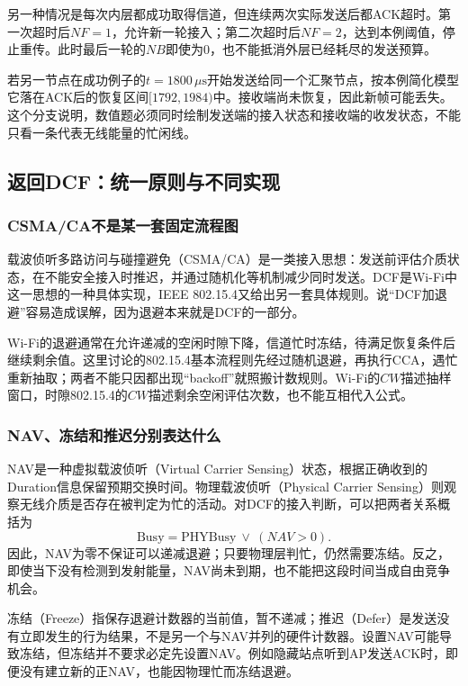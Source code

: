 另一种情况是每次内层都成功取得信道，但连续两次实际发送后都ACK超时。第一次超时后$NF=1$，允许新一轮接入；第二次超时后$NF=2$，达到本例阈值，停止重传。此时最后一轮的$NB$即使为0，也不能抵消外层已经耗尽的发送预算。

若另一节点在成功例子的$t=1800\,\mu\mathrm{s}$开始发送给同一个汇聚节点，按本例简化模型它落在ACK后的恢复区间$[1792,1984)$中。接收端尚未恢复，因此新帧可能丢失。这个分支说明，数值题必须同时绘制发送端的接入状态和接收端的收发状态，不能只看一条代表无线能量的忙闲线。

\subsection{返回DCF：统一原则与不同实现}

\subsubsection{CSMA/CA不是某一套固定流程图}

载波侦听多路访问与碰撞避免（CSMA/CA）是一类接入思想：发送前评估介质状态，在不能安全接入时推迟，并通过随机化等机制减少同时发送。DCF是Wi-Fi中这一思想的一种具体实现，IEEE 802.15.4又给出另一套具体规则。说“DCF加退避”容易造成误解，因为退避本来就是DCF的一部分。

Wi-Fi的退避通常在允许递减的空闲时隙下降，信道忙时冻结，待满足恢复条件后继续剩余值。这里讨论的802.15.4基本流程则先经过随机退避，再执行CCA，遇忙重新抽取；两者不能只因都出现“backoff”就照搬计数规则。Wi-Fi的$CW$描述抽样窗口，时隙802.15.4的$CW$描述剩余空闲评估次数，也不能互相代入公式。

\subsubsection{NAV、冻结和推迟分别表达什么}

NAV是一种虚拟载波侦听（Virtual Carrier Sensing）状态，根据正确收到的Duration信息保留预期交换时间。物理载波侦听（Physical Carrier Sensing）则观察无线介质是否存在被判定为忙的活动。对DCF的接入判断，可以把两者关系概括为
\begin{equation}
 \mathrm{Busy}=\mathrm{PHYBusy}\ \lor\ (NAV>0).
\end{equation}
因此，NAV为零不保证可以递减退避；只要物理层判忙，仍然需要冻结。反之，即使当下没有检测到发射能量，NAV尚未到期，也不能把这段时间当成自由竞争机会。

冻结（Freeze）指保存退避计数器的当前值，暂不递减；推迟（Defer）是发送没有立即发生的行为结果，不是另一个与NAV并列的硬件计数器。设置NAV可能导致冻结，但冻结并不要求必定先设置NAV。例如隐藏站点听到AP发送ACK时，即便没有建立新的正NAV，也能因物理忙而冻结退避。

